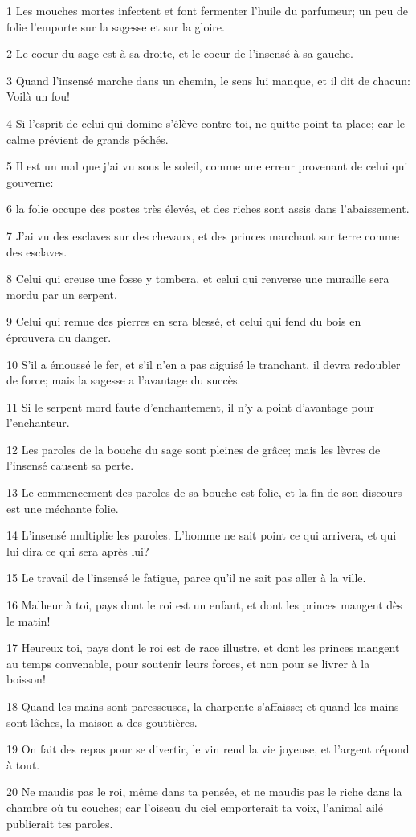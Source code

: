 \par 1 Les mouches mortes infectent et font fermenter l'huile du parfumeur; un peu de folie l'emporte sur la sagesse et sur la gloire.
\par 2 Le coeur du sage est à sa droite, et le coeur de l'insensé à sa gauche.
\par 3 Quand l'insensé marche dans un chemin, le sens lui manque, et il dit de chacun: Voilà un fou!
\par 4 Si l'esprit de celui qui domine s'élève contre toi, ne quitte point ta place; car le calme prévient de grands péchés.
\par 5 Il est un mal que j'ai vu sous le soleil, comme une erreur provenant de celui qui gouverne:
\par 6 la folie occupe des postes très élevés, et des riches sont assis dans l'abaissement.
\par 7 J'ai vu des esclaves sur des chevaux, et des princes marchant sur terre comme des esclaves.
\par 8 Celui qui creuse une fosse y tombera, et celui qui renverse une muraille sera mordu par un serpent.
\par 9 Celui qui remue des pierres en sera blessé, et celui qui fend du bois en éprouvera du danger.
\par 10 S'il a émoussé le fer, et s'il n'en a pas aiguisé le tranchant, il devra redoubler de force; mais la sagesse a l'avantage du succès.
\par 11 Si le serpent mord faute d'enchantement, il n'y a point d'avantage pour l'enchanteur.
\par 12 Les paroles de la bouche du sage sont pleines de grâce; mais les lèvres de l'insensé causent sa perte.
\par 13 Le commencement des paroles de sa bouche est folie, et la fin de son discours est une méchante folie.
\par 14 L'insensé multiplie les paroles. L'homme ne sait point ce qui arrivera, et qui lui dira ce qui sera après lui?
\par 15 Le travail de l'insensé le fatigue, parce qu'il ne sait pas aller à la ville.
\par 16 Malheur à toi, pays dont le roi est un enfant, et dont les princes mangent dès le matin!
\par 17 Heureux toi, pays dont le roi est de race illustre, et dont les princes mangent au temps convenable, pour soutenir leurs forces, et non pour se livrer à la boisson!
\par 18 Quand les mains sont paresseuses, la charpente s'affaisse; et quand les mains sont lâches, la maison a des gouttières.
\par 19 On fait des repas pour se divertir, le vin rend la vie joyeuse, et l'argent répond à tout.
\par 20 Ne maudis pas le roi, même dans ta pensée, et ne maudis pas le riche dans la chambre où tu couches; car l'oiseau du ciel emporterait ta voix, l'animal ailé publierait tes paroles.

